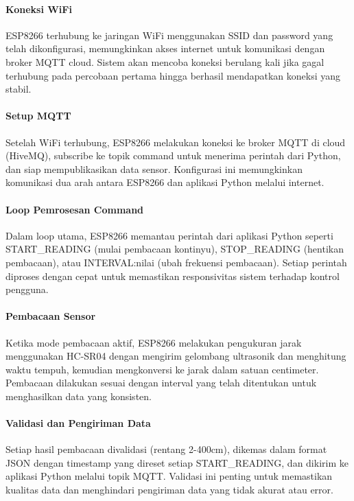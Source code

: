 \paragraph{Koneksi WiFi} ESP8266 terhubung ke jaringan WiFi menggunakan SSID dan password yang telah dikonfigurasi, memungkinkan akses internet untuk komunikasi dengan broker MQTT cloud. Sistem akan mencoba koneksi berulang kali jika gagal terhubung pada percobaan pertama hingga berhasil mendapatkan koneksi yang stabil.

\paragraph{Setup MQTT} Setelah WiFi terhubung, ESP8266 melakukan koneksi ke broker MQTT di cloud (HiveMQ), subscribe ke topik command untuk menerima perintah dari Python, dan siap mempublikasikan data sensor. Konfigurasi ini memungkinkan komunikasi dua arah antara ESP8266 dan aplikasi Python melalui internet.

\paragraph{Loop Pemrosesan Command} Dalam loop utama, ESP8266 memantau perintah dari aplikasi Python seperti START\_READING (mulai pembacaan kontinyu), STOP\_READING (hentikan pembacaan), atau INTERVAL:nilai (ubah frekuensi pembacaan). Setiap perintah diproses dengan cepat untuk memastikan responsivitas sistem terhadap kontrol pengguna.

\paragraph{Pembacaan Sensor} Ketika mode pembacaan aktif, ESP8266 melakukan pengukuran jarak menggunakan HC-SR04 dengan mengirim gelombang ultrasonik dan menghitung waktu tempuh, kemudian mengkonversi ke jarak dalam satuan centimeter. Pembacaan dilakukan sesuai dengan interval yang telah ditentukan untuk menghasilkan data yang konsisten.

\paragraph{Validasi dan Pengiriman Data} Setiap hasil pembacaan divalidasi (rentang 2-400cm), dikemas dalam format JSON dengan timestamp yang direset setiap START\_READING, dan dikirim ke aplikasi Python melalui topik MQTT. Validasi ini penting untuk memastikan kualitas data dan menghindari pengiriman data yang tidak akurat atau error.

